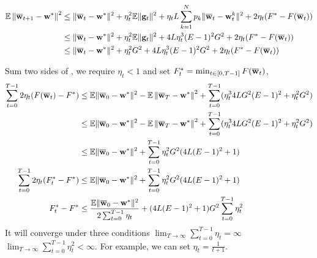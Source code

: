 \begin{align}
\mathbb{E}\left\|{\overline{\mathbf{w}}}_{t+1}-{\mathbf{w}}^{*}\right\|^2 &\leq \|{\overline{\mathbf{w}}}_{t}-{\mathbf{w}}^{*}\|^{2}+\eta_{t}^{2} \mathbb{E}\| {\mathbf{g}}_{t} \|^{2} + \eta_t L \sum_{k=1}^N p_k \|{\overline{\mathbf{w}}}_t - {\mathbf{w}}^{k}_t\|^2 + 2 \eta_{t} (F^* - F({\overline{\mathbf{w}}}_t))\\
&\leq \|{\overline{\mathbf{w}}}_{t}-{\mathbf{w}}^{*}\|^{2}+\eta_{t}^{2} \mathbb{E}\| {\mathbf{g}}_{t} \|^{2} +  4L\eta_t^3(E-1)^2 G^2 + 2 \eta_{t} (F^* - F({\overline{\mathbf{w}}}_t))\\
&\leq \|{\overline{\mathbf{w}}}_{t}-{\mathbf{w}}^{*}\|^{2}+\eta_{t}^{2} G^2 +  4L\eta_t^3(E-1)^2 G^2 + 2 \eta_{t} (F^* - F({\overline{\mathbf{w}}}_t)) \label{eq:cvxsgd1}
\end{align}

Sum two sides of \eq{\ref{eq:cvxsgd1}}, we require $\eta_t < 1$ and set $F^*_t = \min_{t \in [0, T-1]} F({\overline{\mathbf{w}}}_t)$, 
\begin{align*}
	\sum_{t=0}^{T-1} 2\eta_t (F({\overline{\mathbf{w}}}_t) - F^* ) & \leq \mathbb{E} \|{\overline{\mathbf{w}}}_{0}-{\mathbf{w}}^{*}\|^{2} - \mathbb{E}\left\|{\overline{\mathbf{w}}}_{T}-{\mathbf{w}}^{*}\right\|^2 + \sum_{t=0}^{T-1} (\eta_t^3 4LG^2(E-1)^2 + \eta_t^2 G^2)\\ 
    & \leq \mathbb{E} \|{\overline{\mathbf{w}}}_{0}-{\mathbf{w}}^{*}\|^{2} - \mathbb{E}\left\|{\overline{\mathbf{w}}}_{T}-{\mathbf{w}}^{*}\right\|^2 + \sum_{t=0}^{T-1} (\eta_t^3 4LG^2(E-1)^2 + \eta_t^2 G^2)\\ 
    & \leq \mathbb{E} \|{\overline{\mathbf{w}}}_{0}-{\mathbf{w}}^{*}\|^{2} + \sum_{t=0}^{T-1}\eta_t^2G^2 ( 4L(E-1)^2 + 1)\\
    \sum_{t=0}^{T-1} 2\eta_t (F^*_t - F^* ) & \leq \mathbb{E} \|{\overline{\mathbf{w}}}_{0}-{\mathbf{w}}^{*}\|^{2} + \sum_{t=0}^{T-1}\eta_t^2G^2 ( 4L(E-1)^2 + 1)\\
 F_t^* - F^*  & \leq \frac{\mathbb{E} \|{\overline{\mathbf{w}}}_{0}-{\mathbf{w}}^{*}\|^{2}}{2 \sum_{t=0}^{T-1} \eta_t } + ( 4L(E-1)^2 + 1)G^2 \sum_{t=0}^{T-1} \eta_t^2
\end{align*}
It will converge under three conditions $ \lim_{T \rightarrow \infty }\sum_{t=0}^{T-1} \eta_t = \infty$
$ \lim_{T \rightarrow \infty }\sum_{t=0}^{T-1} \eta_t^2 < \infty$. For example, we can set $\eta_t = \frac{1}{t+1}$.


	